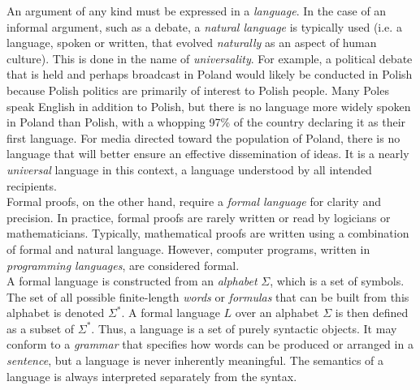 
An argument of any kind must be expressed in a \textit{language}. In the case of an informal argument, such as a debate, a \textit{natural language} is typically used (i.e. a language, spoken or written, that evolved \textit{naturally} as an aspect of human culture). This is done in the name of \textit{universality}. For example, a political debate that is held and perhaps broadcast in Poland would likely be conducted in Polish because Polish politics are primarily of interest to Polish people. Many Poles speak English in addition to Polish, but there is no language more widely spoken in Poland than Polish, with a whopping 97\% of the country declaring it as their first language. For media directed toward the population of Poland, there is no language that will better ensure an effective dissemination of ideas. It is a nearly \textit{universal} language in this context, a language understood by all intended recipients. \\

Formal proofs, on the other hand, require a \textit{formal language} for clarity and precision. In practice, formal proofs are rarely written or read by logicians or mathematicians. Typically, mathematical proofs are written using a combination of formal and natural language. However, computer programs, written in \textit{programming languages}, are considered formal. \\

A formal language is constructed from an \textit{alphabet} $\Sigma$, which is a set of symbols. The set of all possible finite-length \textit{words} or \textit{formulas} that can be built from this alphabet is denoted $\Sigma^*$. A formal language $L$ over an alphabet $\Sigma$ is then defined as a subset of $\Sigma^*$. Thus, a language is a set of purely syntactic objects. It may conform to a \textit{grammar} that specifies how words can be produced or arranged in a \textit{sentence}, but a language is never inherently meaningful. The semantics of a language is always interpreted separately from the syntax. \\



